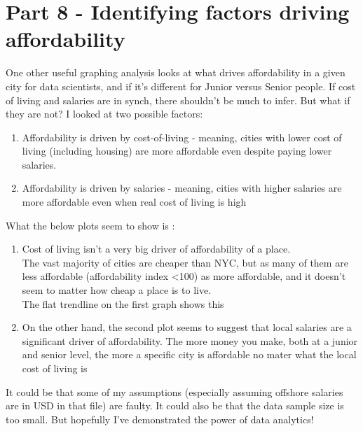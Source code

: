 \documentclass[11pt]{article}
\providecommand{\tightlist}{%
      \setlength{\itemsep}{0pt}\setlength{\parskip}{0pt}}
\begin{document}
    \hypertarget{part-8---identifying-factors-driving-affordability}{%
\section{Part 8 - Identifying factors driving
affordability}\label{part-8---identifying-factors-driving-affordability}}

    One other useful graphing analysis looks at what drives affordability in
a given city for data scientists, and if it's different for Junior
versus Senior people. If cost of living and salaries are in synch, there
shouldn't be much to infer. But what if they are not? I looked at two
possible factors:

\begin{enumerate}
\def\labelenumi{\arabic{enumi})}
\tightlist
\item
  Affordability is driven by cost-of-living - meaning, cities with lower
  cost of living (including housing) are more affordable even despite
  paying lower salaries.\\
\item
  Affordability is driven by salaries - meaning, cities with higher
  salaries are more affordable even when real cost of living is high
\end{enumerate}

What the below plots seem to show is :

\begin{enumerate}
\def\labelenumi{\arabic{enumi})}
\tightlist
\item
  Cost of living isn't a very big driver of affordability of a place.\\
  The vast majority of cities are cheaper than NYC, but as many of them
  are less affordable (affordability index \textless100) as more
  affordable, and it doesn't seem to matter how cheap a place is to
  live.\\
  The flat trendline on the first graph shows this
\item
  On the other hand, the second plot seems to suggest that local
  salaries are a significant driver of affordability. The more money you
  make, both at a junior and senior level, the more a specific city is
  affordable no mater what the local cost of living is
\end{enumerate}

It could be that some of my assumptions (especially assuming offshore
salaries are in USD in that file) are faulty. It could also be that the
data sample size is too small. But hopefully I've demonstrated the power
of data analytics!
\end{document}
